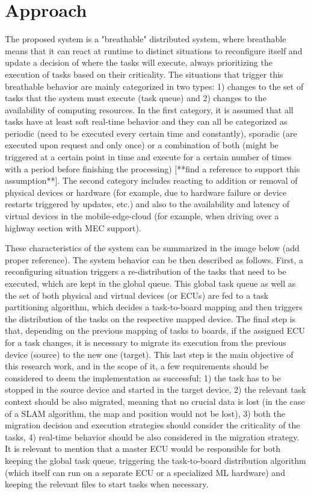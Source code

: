 
\chapter{Approach}\label{chap:approach}

The proposed system is a "breathable" distributed system, where breathable means that it can react at runtime to distinct situations to reconfigure itself and update a decision of where the tasks will execute, always prioritizing the execution of tasks based on their criticality. The situations that trigger this breathable behavior are mainly categorized in two types: 1) changes to the set of tasks that the system must execute (task queue) and 2) changes to the availability of computing resources. In the first category, it is assumed that all tasks have at least soft real-time behavior and they can all be categorized as periodic (need to be executed every certain time and constantly), sporadic (are executed upon request and only once) or a combination of both (might be triggered at a certain point in time and execute for a certain number of times with a period before finishing the processing) [**find a reference to support this assumption**]. The second category includes reacting to addition or removal of physical devices or hardware (for example, due to hardware failure or device restarts triggered by updates, etc.) and also to the availability and latency of virtual devices in the mobile-edge-cloud (for example, when driving over a highway section with MEC support).

These characteristics of the system can be summarized in the image below (add proper reference). The system behavior can be then described as follows. First, a reconfiguring situation triggers a re-distribution of the tasks that need to be executed, which are kept in the global queue. This global task queue as well as the set of both physical and virtual devices (or ECUs) are fed to a task partitioning algorithm, which decides a task-to-board mapping and then triggers the distribution of the tasks on the respective mapped device. The final step is that, depending on the previous mapping of tasks to boards, if the assigned ECU for a task changes, it is necessary to migrate its execution from the previous device (source) to the new one (target). This last step is the main objective of this research work, and in the scope of it, a few requirements should be considered to deem the implementation as successful: 1) the task has to be stopped in the source device and started in the target device, 2) the relevant task context should be also migrated, meaning that no crucial data is lost (in the case of a SLAM algorithm, the map and position would not be lost), 3) both the migration decision and execution strategies should consider the criticality of the tasks, 4) real-time behavior should be also considered in the migration strategy. It is relevant to mention that a master ECU would be responsible for both keeping the global task queue, triggering the task-to-board distribution algorithm (which itself can run on a separate ECU or a specialized ML hardware) and keeping the relevant files to start tasks when necessary.
 

